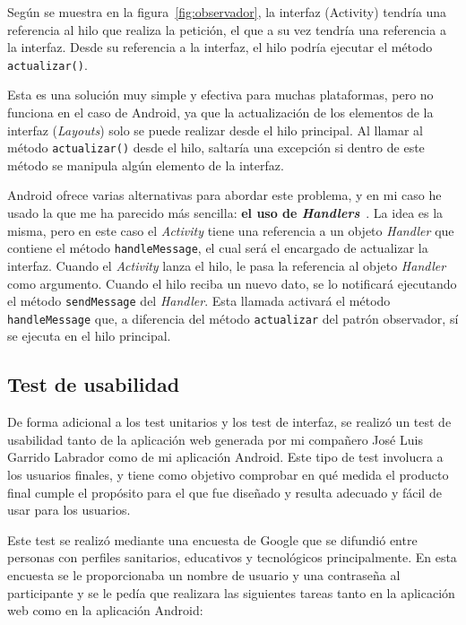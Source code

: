 Según se muestra en la figura~\ref{fig:observador}, la interfaz (Activity) tendría una referencia al hilo que realiza la petición, el que a su vez tendría una referencia a la interfaz. Desde su referencia a la interfaz, el hilo podría ejecutar el método \texttt{actualizar()}.

Esta es una solución muy simple y efectiva para muchas plataformas, pero no funciona en el caso de Android, ya que la actualización de los elementos de la interfaz (\textit{Layouts}) solo se puede realizar desde el hilo principal. Al llamar al método \texttt{actualizar()} desde el hilo, saltaría una excepción si dentro de este método se manipula algún elemento de la interfaz. 

Android ofrece varias alternativas para abordar este problema, y en mi caso he usado la que me ha parecido más sencilla: \textbf{el uso de \textit{Handlers}}~\cite{handler}. La idea es la misma, pero en este caso el \textit{Activity} tiene una referencia a un objeto \textit{Handler} que contiene el método \texttt{handleMessage}, el cual será el encargado de actualizar la interfaz. Cuando el \textit{Activity} lanza el hilo, le pasa la referencia al objeto \textit{Handler} como argumento. Cuando el hilo reciba un nuevo dato, se lo notificará ejecutando el método \texttt{sendMessage} del \textit{Handler}. Esta llamada activará el método \texttt{handleMessage} que, a diferencia del método \texttt{actualizar} del patrón observador, sí se ejecuta en el hilo principal. 

\subsection{Test de usabilidad}

De forma adicional a los test unitarios y los test de interfaz, se realizó un test de usabilidad tanto de la aplicación web generada por mi compañero José Luis Garrido Labrador como de mi aplicación Android. Este tipo de test involucra a los usuarios finales, y tiene como objetivo comprobar en qué medida el producto final cumple el propósito para el que fue diseñado y resulta adecuado y fácil de usar para los usuarios. 

Este test se realizó mediante una encuesta de Google que se difundió entre personas con perfiles sanitarios, educativos y tecnológicos principalmente. En esta encuesta se le proporcionaba un nombre de usuario y una contraseña al participante y se le pedía que realizara las siguientes tareas tanto en la aplicación web como en la aplicación Android: 

